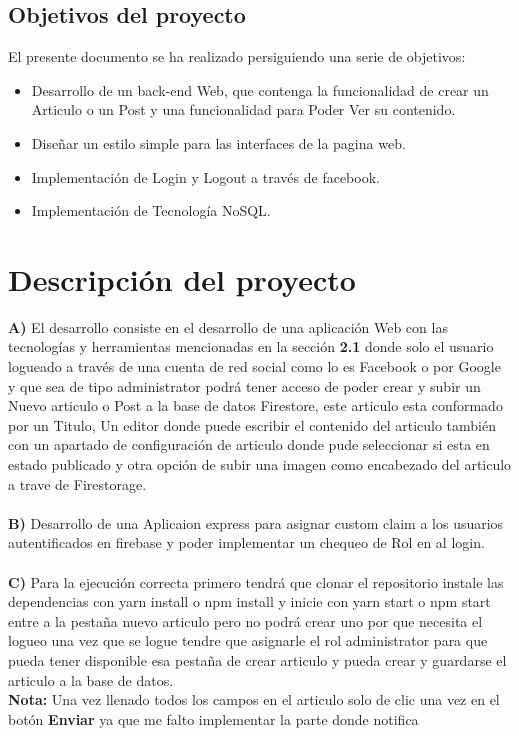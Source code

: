 \documentclass[60pt]{article}
\begin{document}
\subsection{Objetivos del proyecto}
El presente documento se ha realizado persiguiendo una serie de objetivos:
\begin{itemize}
    \item Desarrollo de un back-end Web, que contenga la funcionalidad de crear un Articulo o un Post y una funcionalidad para Poder Ver su contenido.
    \item Diseñar un estilo simple para las interfaces de la pagina web.
    \item Implementación de Login y Logout a través de facebook.
    \item Implementación de Tecnología NoSQL.
\end{itemize}

\section{Descripción del proyecto}
\textsf{\textbf{A)}} El desarrollo consiste en el desarrollo de una aplicación Web con las tecnologías y herramientas mencionadas en la sección \textsf{\textbf{2.1}} donde solo el usuario logueado a través de una cuenta de red social como lo es Facebook o por Google y que sea de tipo administrator podrá tener acceso de poder crear y subir un Nuevo articulo o Post a la base de datos Firestore, este articulo esta conformado por un Titulo, Un editor donde puede escribir el contenido del articulo también con un apartado de configuración de articulo donde pude seleccionar si esta en estado publicado y otra opción de subir una imagen como encabezado del articulo a trave de Firestorage.
\\
\\
\textsf{\textbf{B)}} Desarrollo de una Aplicaion express para asignar custom claim a los usuarios autentificados en firebase y poder implementar un chequeo de Rol en al login.
\\
\\
\textsf{\textbf{C)}} Para la ejecución correcta primero tendrá que clonar el repositorio instale las dependencias con yarn install o npm install y inicie con yarn start o npm start entre a la pestaña nuevo articulo pero no podrá crear uno por que necesita el logueo una vez que se logue tendre que asignarle el rol administrator para que pueda tener disponible esa pestaña de crear articulo y pueda crear y guardarse el articulo a la base de datos.
\\
\textsf{\textbf{Nota:}} Una vez llenado todos los campos en el articulo solo de clic una vez en el botón \textsf{\textbf{Enviar}} ya que me falto implementar la parte donde notifica
\\
\end{document}

